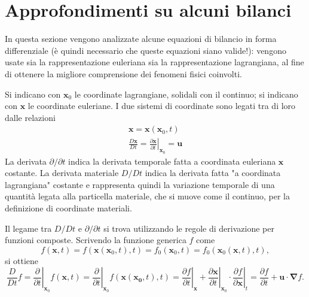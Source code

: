 \section{Approfondimenti su alcuni bilanci}

In questa sezione vengono analizzate alcune equazioni di bilancio
 in forma differenziale (è quindi necessario che queste equazioni siano
 valide!):
 vengono usate sia la rappresentazione euleriana sia la rappresentazione
 lagrangiana, al fine di ottenere la migliore comprensione dei fenomeni 
 fisici coinvolti.
 
Si indicano con $\bm{x}_0$ le coordinate lagrangiane, solidali con il 
 continuo; si indicano con $\bm{x}$ le coordinate euleriane.
I due sistemi di coordinate sono legati tra di loro dalle relazioni
\begin{equation}
\begin{aligned}
 \bm{x} = \bm{x}(\bm{x}_0,t) \\
 \frac{D \bm{x}}{D t} = \left.\frac{\partial \bm{x}}{\partial t}\right|_{\bm{x}_0} = 
 \bm{u}
\end{aligned}
\end{equation}
La derivata $\partial/\partial t$ indica la derivata temporale fatta
 a coordinata euleriana $\bm{x}$ costante. La derivata materiale 
 $D/D t$ indica la derivata fatta "a coordinata lagrangiana" costante
 e rappresenta quindi la variazione temporale di una quantità legata
 alla particella materiale, che si muove come il continuo, per la definizione
 di coordinate materiali.

\noindent
Il legame tra $D/Dt$ e $\partial/\partial t$ si trova utilizzando le
 regole di derivazione per funzioni composte. Scrivendo la funzione generica $f$ come
\begin{equation}
 f(\bm{x},t) = f(\bm{x}(\bm{x}_0,t),t)
  = f_0(\bm{x}_0,t) = f_0(\bm{x}_0(\bm{x},t),t) ,
\end{equation}
%
si ottiene
\begin{equation}
 \frac{D}{Dt} f = \left.\frac{\partial}{\partial t}\right|_{\bm{x}_0} f(\bm{x},t) =
   \left.\frac{\partial}{\partial t}\right|_{\bm{x}_0} f(\bm{x}(\bm{x_0},t),t) = 
   \left.\frac{\partial f}{\partial t}\right|_{\bm{x}} +
   \left.\frac{\partial \bm{x}}{\partial t}\right|_{\bm{x}_0} \cdot
   \left.\frac{\partial f}{\partial \bm{x}}\right|_{t}
   = \frac{\partial f}{\partial t} +
    \bm{u} \cdot \bm{\nabla} f .
\end{equation}


